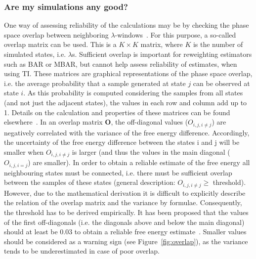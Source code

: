 \documentclass[9pt,bestpractices]{livecoms}
\begin{document}
\subsubsection{Are my simulations any good?}
One way of assessing reliability of the calculations may be by checking the phase space overlap between neighboring $\lambda$-windows~\cite{wu2005phasespace,wu2005phasespacea}. For this purpose, a so-called overlap matrix can be used. This is a $K\times K$ matrix, where $K$ is the number of simulated states, i.e. $\lambda$s. Sufficient overlap is important for reweighting estimators such as BAR or MBAR, but cannot help assess reliability of estimates, when using TI. 
These matrices are graphical representations of the phase space overlap, i.e. the average probability that a sample generated at state $j$ can be observed at state $i$. As this probability is computed considering the samples from all states (and not just the adjacent states), the values in each row and column add up to 1. Details on the calculation and properties of these matrices can be found elsewhere~\cite{klimovich2015guidelines}.
In an overlap matrix $\mathbf{O}$, the off-diagonal values (${O}_{i,j,i\ne j}$) are negatively correlated with the variance of the free energy difference. Accordingly, the uncertainty of the free energy difference between the states i and j will be smaller when ${O}_{i,j,i\ne j}$ is larger (and thus the values in the main diagonal (${O}_{i,j,i=j}$) are smaller). In order to obtain a reliable estimate of the free energy all neighbouring states must be connected, i.e. there must be sufficient overlap between the samples of these states (general description: ${O}_{i,j,i\ne j}\ge$ threshold).
However, due to the mathematical derivation it is difficult to explicitly describe the relation of the overlap matrix and the variance by formulae. Consequently, the threshold has to be derived empirically. It has been proposed that the values of the first off-diagonals (i.e. the diagonals above and below the main diagonal) should at least be 0.03 to obtain a reliable free energy estimate~\cite{klimovich2015guidelines}. Smaller values should be considered as a warning sign (see Figure~\ref{fig:overlap}), as the variance tends to be underestimated in case of poor overlap.
\end{document}
